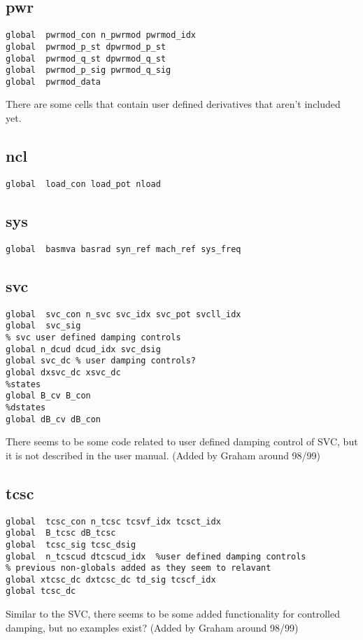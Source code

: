 \subsection{pwr}
\begin{verbatim}
global  pwrmod_con n_pwrmod pwrmod_idx
global  pwrmod_p_st dpwrmod_p_st
global  pwrmod_q_st dpwrmod_q_st
global  pwrmod_p_sig pwrmod_q_sig
global  pwrmod_data
\end{verbatim}
There are some cells that contain user defined derivatives that aren't included yet.

\subsection{ncl}
\begin{verbatim}
global  load_con load_pot nload
\end{verbatim}
\subsection{sys}
\begin{verbatim}
global  basmva basrad syn_ref mach_ref sys_freq
\end{verbatim}

\subsection{svc}
\begin{verbatim}
global  svc_con n_svc svc_idx svc_pot svcll_idx
global  svc_sig
% svc user defined damping controls
global n_dcud dcud_idx svc_dsig
global svc_dc % user damping controls?
global dxsvc_dc xsvc_dc
%states
global B_cv B_con
%dstates
global dB_cv dB_con
\end{verbatim}
There seems to be some code related to user defined damping control of SVC, but it is not described in the user manual. 
(Added by Graham around 98/99)


\subsection{tcsc}
\begin{verbatim}
global  tcsc_con n_tcsc tcsvf_idx tcsct_idx
global  B_tcsc dB_tcsc
global  tcsc_sig tcsc_dsig
global  n_tcscud dtcscud_idx  %user defined damping controls
% previous non-globals added as they seem to relavant
global xtcsc_dc dxtcsc_dc td_sig tcscf_idx 
global tcsc_dc
\end{verbatim}
Similar to the SVC, there seems to be some added functionality for controlled damping, but no examples exist? (Added by Graham around 98/99)

